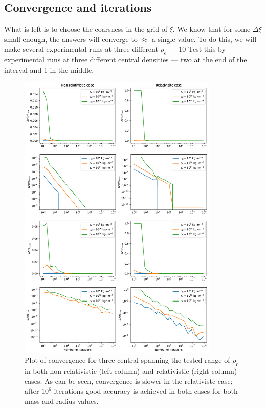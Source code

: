 \documentclass[]{article}
\newcommand{\rhoCentre}{\rho_\mathrm{c}}
\begin{document}
\subsection{Convergence and iterations}\label{subsec:convergence}
	What is left is to choose the coarsness in the grid of $\xi$. We know that for some $\Delta \xi$ small enough, the answers will converge to $\approx$ a single value. To do this, we will make several experimental runs at three different $\rhoCentre$ --- $10$ Test this by experimental runs at three different central densities --- two at the end of the interval and 1 in the middle.
	\begin{figure}[htb]
		\centering
		\includegraphics[width=0.85\textwidth,keepaspectratio]{figures/convergencePlot.pdf}
		\caption{Plot of convergence for three central spanning the tested range of $\rhoCentre$ in both non-relativistic (left column) and relativistic (right column) cases. As can be seen, convergence is slower in the relativistc case; after $10^6$ iterations good accuracy is achieved in both cases for both mass and radius values.}
	\end{figure}
\end{document}
